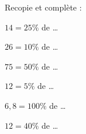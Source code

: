 Recopie et complète :
\begin{multicols}{2}
\begin{myenumerate}
  \item $14=25\%$ de \ldots
  \item $26=10\%$ de \ldots
  \item $75=50\%$ de \ldots
  \item $12=5\%$ de \ldots
  \item $6,8=100\%$ de \ldots
  \item $12=40\%$ de \ldots
\end{myenumerate}
\end{multicols}